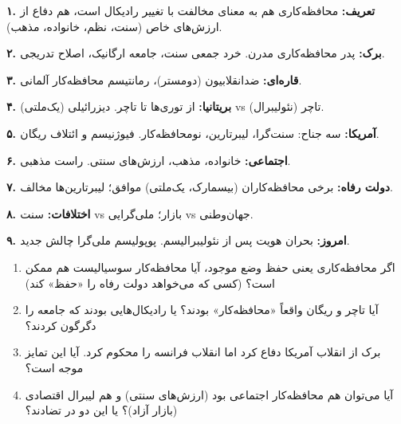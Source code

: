 
\newpage

\begin{summarybox}

\textbf{۱. تعریف:} محافظه‌کاری هم به معنای مخالفت با تغییر رادیکال است، هم دفاع از ارزش‌های خاص (سنت، نظم، خانواده، مذهب).

\textbf{۲. برک:} پدر محافظه‌کاری مدرن. خرد جمعی سنت، جامعه ارگانیک، اصلاح تدریجی.

\textbf{۳. قاره‌ای:} ضدانقلابیون (دومستر)، رمانتیسم محافظه‌کار آلمانی.

\textbf{۴. بریتانیا:} از توری‌ها تا تاچر. دیزرائیلی (یک‌ملتی) vs تاچر (نئولیبرال).

\textbf{۵. آمریکا:} سه جناح: سنت‌گرا، لیبرتارین، نومحافظه‌کار. فیوژنیسم و ائتلاف ریگان.

\textbf{۶. اجتماعی:} خانواده، مذهب، ارزش‌های سنتی. راست مذهبی.

\textbf{۷. دولت رفاه:} برخی محافظه‌کاران (بیسمارک، یک‌ملتی) موافق؛ لیبرتارین‌ها مخالف.

\textbf{۸. اختلافات:} سنت vs بازار؛ ملی‌گرایی vs جهان‌وطنی.

\textbf{۹. امروز:} بحران هویت پس از نئولیبرالیسم. پوپولیسم ملی‌گرا چالش جدید.

\end{summarybox}

\vspace{20pt}

\begin{questionbox}

\begin{enumerate}[nosep, rightmargin=1cm]
    \item اگر محافظه‌کاری یعنی حفظ وضع موجود، آیا محافظه‌کار سوسیالیست هم ممکن است؟ (کسی که می‌خواهد دولت رفاه را «حفظ» کند)

    \item آیا تاچر و ریگان واقعاً «محافظه‌کار» بودند؟ یا رادیکال‌هایی بودند که جامعه را دگرگون کردند؟

    \item برک از انقلاب آمریکا دفاع کرد اما انقلاب فرانسه را محکوم کرد. آیا این تمایز موجه است؟

    \item آیا می‌توان هم محافظه‌کار اجتماعی بود (ارزش‌های سنتی) و هم لیبرال اقتصادی (بازار آزاد)؟ یا این دو در تضادند؟
\end{enumerate}

\end{questionbox}

